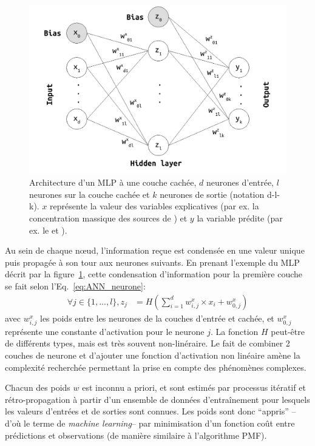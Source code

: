 \begin{figure}[ht]
    \centering
    \includegraphics[width=0.7\linewidth]{figures/chapter05/MLP_architecture.pdf}
    \caption{Architecture d'un MLP à une couche cachée, $d$ neurones d'entrée, $l$
    neurones sur la couche cachée et $k$ neurones de sortie (notation d-l-k). $x$
    représente la valeur des variables explicatives (par ex. la concentration massique des
    sources de \PMdix) et $y$ la variable prédite (par ex. le \POAAv{} et \PODTTv).}%
    \label{fig:MLP_architecture}
\end{figure}

Au sein de chaque nœud, l'information reçue est condensée en une valeur unique puis propagée à
son tour aux neurones suivants. En prenant l'exemple du MLP décrit par la
figure~\ref{fig:MLP_architecture}, cette condensation d'information pour la première
couche se fait selon l'Eq.~\ref{eq:ANN_neurone}:
\begin{align}
    \label{eq:ANN_neurone}
    \forall j \in \{1, ..., l\}, z_j &= H\left( \sum_{i=1}^d w^x_{i,j} \times x_i + w^x_{0,j} \right)
\end{align}
avec $w^x_{i,j}$ les poids entre les neurones de la couches d'entrée et cachée, et
$w^x_{0,j}$ représente une constante d'activation pour le neurone $j$. La fonction $H$
peut-être de différents types, mais est très souvent non-linéraire. Le fait de combiner 2
couches de neurone et d'ajouter une fonction d'activation non linéaire amène la
complexité recherchée permettant la prise en compte des phénomènes complexes.

Chacun des poids $w$ est inconnu a priori, et sont estimés par processus itératif et
rétro-propagation à partir d'un ensemble de données d'entraînement pour lesquels les
valeurs d'entrées et de sorties sont connues. Les poids sont donc ``appris'' --d'où le
terme de \textit{machine learning}-- par minimisation d'un fonction coût entre prédictions
et observations (de manière similaire à l'algorithme PMF).

